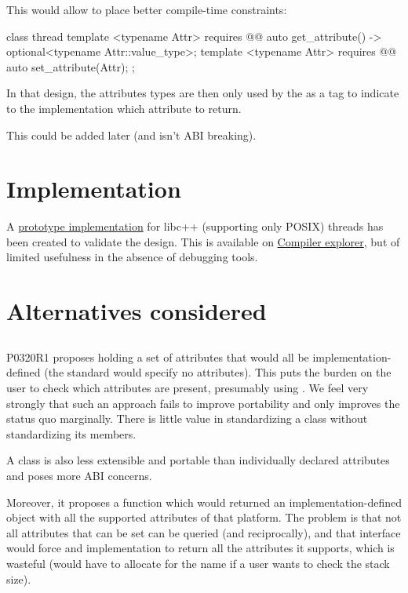\documentclass{wg21}
\begin{document}
This would allow to place better compile-time constraints:

\begin{colorblock}
	class thread {
		template <typename Attr>
		requires @@
		auto get_attribute() -> optional<typename Attr::value_type>;
		template <typename Attr>
		requires @@
		auto set_attribute(Attr);
	};
\end{colorblock}

In that design, the attributes types are then only used by the  as a tag to indicate to the implementation which attribute to return.

This could be added later (and isn't ABI breaking).

\section{Implementation}

A \href{https://github.com/cor3ntin/llvm-project/tree/corentin/thread_name_p2019}{prototype implementation} for libc++ (supporting only POSIX) threads has been created to validate the design.
This is available on \href{https://compiler-explorer.com/z/MzGsndc7W}{Compiler explorer}, but of limited usefulness in the absence of debugging tools.

\section{Alternatives considered}

\subsection{}

P0320R1 proposes  holding a set of attributes that would all be implementation-defined (the standard would specify no attributes).
This puts the burden on the user to check which attributes are present, presumably using .
We feel very strongly that such an approach fails to improve portability and only improves the status quo marginally.
There is little value in standardizing a class without standardizing its members.

A class is also less extensible and portable than individually declared attributes and poses more ABI concerns.

Moreover, it proposes a  function which would returned an implementation-defined object
with all the supported attributes of that platform.
The problem is that not all attributes that can be set can be queried (and reciprocally), and that interface would force
and implementation to return all the attributes it supports, which is wasteful (would have to allocate for the name if a user wants to check the stack size).
\end{document}
